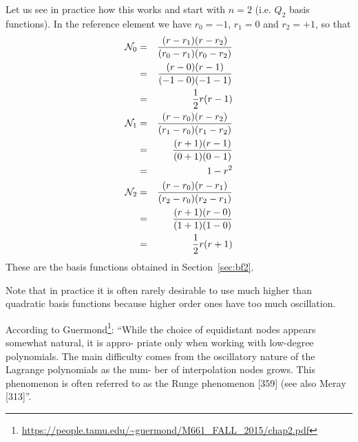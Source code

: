 Let us see in practice how this works and start with $n=2$ (i.e. $Q_2$ basis functions).
In the reference element we have $r_0=-1$, $r_1=0$ and $r_2=+1$, so that 
\begin{eqnarray}
{\mathcal{N}}_0 
&=& \frac{(r-r_1)(r-r_2)}{(r_0-r_1)(r_0-r_2)} \nonumber\\
&=& \frac{(r-0)(r-1)}{(-1-0)(-1-1)} \nonumber\\
&=& \frac12 r(r-1) \nonumber\\
{\mathcal{N}}_1
&=& \frac{(r-r_0)(r-r_2)}{(r_1-r_0)(r_1-r_2)} \nonumber\\
&=& \frac{(r+1)(r-1)}{(0+1)(0-1)} \nonumber\\
&=& 1-r^2 \nonumber\\
{\mathcal{N}}_2 
&=& \frac{(r-r_0)(r-r_1)}{(r_2-r_0)(r_2-r_1)} \nonumber\\
&=& \frac{(r+1)(r-0)}{(1+1)(1-0)} \nonumber\\
&=& \frac12 r(r+1) 
\end{eqnarray}
These are the basis functions obtained in Section~\ref{sec:bf2}.

Note that in practice it is often rarely desirable to use much higher 
than quadratic basis functions because higher order ones 
have too much oscillation.

According to Guermond\footnote{\url{https://people.tamu.edu/~guermond/M661_FALL_2015/chap2.pdf}}:
{\color{darkgray} ``While the choice of equidistant nodes appears somewhat natural, it is appro-
priate only when working with low-degree polynomials. The main diﬃculty
comes from the oscillatory nature of the Lagrange polynomials as the num-
ber of interpolation nodes grows. This phenomenon is often referred to as the
Runge phenomenon [359] (see also Meray [313]''}.

